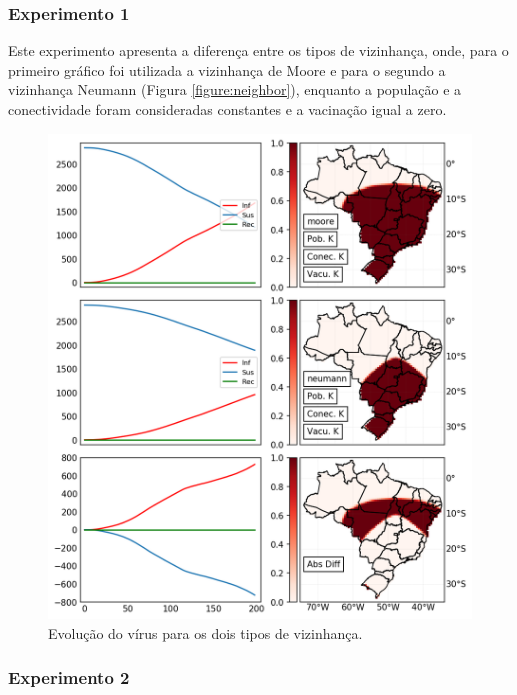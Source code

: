 \documentclass[a4paper,12pt]{article}
\begin{document}
\newpage
\subsubsection{Experimento 1}
\label{sub:exp1}

Este experimento apresenta a diferença entre os tipos de vizinhança, onde, para o primeiro gráfico foi utilizada a vizinhança de Moore e para o segundo a vizinhança Neumann (Figura \ref{figure:neighbor}), enquanto a população e a conectividade foram consideradas constantes e a vacinação igual a zero.

\begin{figure}[!ht]
 \begin{center}
  \includegraphics[width=1\linewidth]{fig/Vecino.png}
 \end{center}
 \caption{Evolução do vírus para os dois tipos de vizinhança.}
\label{figure:vizinho}
\end{figure}

\newpage
\subsubsection{Experimento 2}
\label{sub:exp2}
\end{document}
